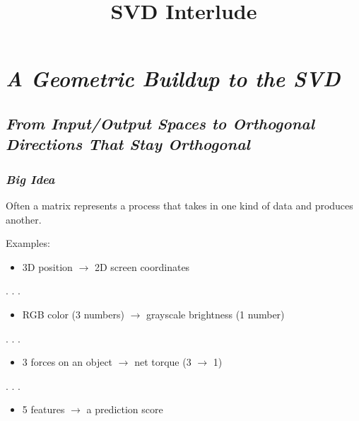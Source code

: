 \documentclass[
  letterpaper,
  DIV=11,
  numbers=noendperiod]{scrartcl}
\title{SVD Interlude}
\author{}
\date{}
\providecommand{\tightlist}{%
  \setlength{\itemsep}{0pt}\setlength{\parskip}{0pt}}\usepackage{longtable,booktabs,array}
\begin{document}
\maketitle


\section{\texorpdfstring{\emph{A Geometric Buildup to the
SVD}}{A Geometric Buildup to the SVD}}\label{a-geometric-buildup-to-the-svd}

\subsection{\texorpdfstring{\emph{From Input/Output Spaces to Orthogonal
Directions That Stay
Orthogonal}}{From Input/Output Spaces to Orthogonal Directions That Stay Orthogonal}}\label{from-inputoutput-spaces-to-orthogonal-directions-that-stay-orthogonal}

\subsubsection{\texorpdfstring{\emph{Big
Idea}}{Big Idea}}\label{big-idea}

Often a matrix represents a process that takes in one kind of data and
produces another.

Examples:

\begin{itemize}
\tightlist
\item
  3D position \(\to\) 2D screen coordinates
\end{itemize}

. . .

\begin{itemize}
\tightlist
\item
  RGB color (3 numbers) \(\to\) grayscale brightness (1 number)
\end{itemize}

. . .

\begin{itemize}
\tightlist
\item
  3 forces on an object \(\to\) net torque (3 \(\to\) 1)
\end{itemize}

. . .

\begin{itemize}
\tightlist
\item
  5 features \(\to\) a prediction score
\end{itemize}
\end{document}
